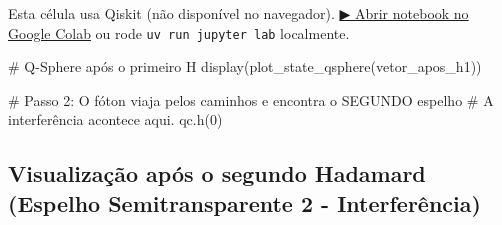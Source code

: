 \documentclass[
  brazilian,
]{report}
\newenvironment{Shaded}{\begin{snugshade}}{\end{snugshade}}
\newcommand{\CommentTok}[1]{\textcolor[rgb]{0.37,0.37,0.37}{#1}}
\newcommand{\NormalTok}[1]{\textcolor[rgb]{0.00,0.23,0.31}{#1}}
\begin{document}
\begin{tcolorbox}[enhanced jigsaw, arc=.35mm, bottomrule=.15mm, bottomtitle=1mm, breakable, colback=white, colbacktitle=quarto-callout-warning-color!10!white, colframe=quarto-callout-warning-color-frame, coltitle=black, left=2mm, leftrule=.75mm, opacityback=0, opacitybacktitle=0.6, rightrule=.15mm, title=\textcolor{quarto-callout-warning-color}{\faExclamationTriangle}\hspace{0.5em}{⚛️ Célula Qiskit --- execute no Colab ou localmente}, titlerule=0mm, toprule=.15mm, toptitle=1mm]

Esta célula usa Qiskit (não disponível no navegador).
\href{https://colab.research.google.com/github/maxwellamaral/aula-quantum/blob/main/notebooks/04-Hadamard-experiment.ipynb}{▶
Abrir notebook no Google Colab} ou rode \texttt{uv\ run\ jupyter\ lab}
localmente.

\begin{Shaded}
\begin{Highlighting}[]

\CommentTok{\# Q{-}Sphere após o primeiro H}
\NormalTok{display(plot\_state\_qsphere(vetor\_apos\_h1))}
\end{Highlighting}
\end{Shaded}

\end{tcolorbox}

\begin{Shaded}
\begin{Highlighting}[]


\NormalTok{\# Passo 2: O fóton viaja pelos caminhos e encontra o SEGUNDO espelho}
\NormalTok{\# A interferência acontece aqui.}
\NormalTok{qc.h(0)}
\end{Highlighting}
\end{Shaded}

\subsection{Visualização após o segundo Hadamard (Espelho
Semitransparente 2 -
Interferência)}\label{visualizauxe7uxe3o-apuxf3s-o-segundo-hadamard-espelho-semitransparente-2---interferuxeancia}
\end{document}
